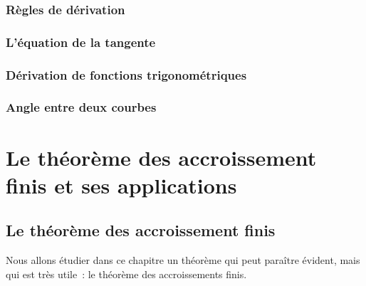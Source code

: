 \documentclass[a4paper,12pt]{article}
\begin{document}
\subsubsection{Règles de dérivation}


\subsubsection{L'équation de la tangente}
\subsubsection{Dérivation de fonctions trigonométriques}


\subsubsection{Angle entre deux courbes}

\section{Le théorème des accroissement finis et ses applications}

\subsection{Le théorème des accroissement finis}
Nous allons étudier dans ce chapitre un théorème qui peut paraître évident, mais qui est très utile~: le théorème des accroissements finis. 
\medskip
\end{document}
